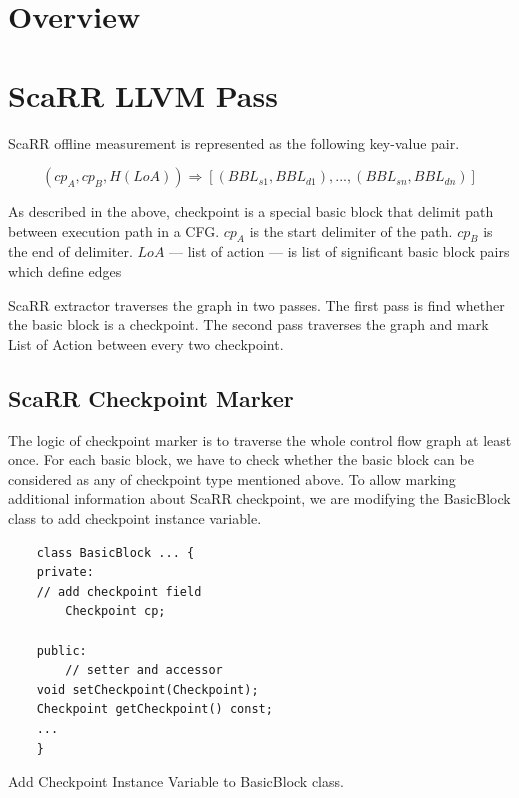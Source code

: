 \section{Overview}



\section{ScaRR LLVM Pass}

ScaRR offline measurement is represented as the following key-value pair.

$$(cp_A, cp_B, H(LoA)) \Rightarrow [(BBL_{s1}, BBL_{d1}), ..., (BBL_{sn}, BBL_{dn})]$$

As described in the above, checkpoint is a special basic block that delimit path between execution path in a CFG. $cp_A$ is the start delimiter of the path. $cp_B$ is the end of delimiter. $LoA$ — list of action — is list of significant basic block pairs which define edges 

ScaRR extractor traverses the graph in two passes. The first pass is find whether the basic block is a checkpoint. The second pass traverses the graph and mark List of Action between every two checkpoint. 

\subsection{ScaRR Checkpoint Marker}

The logic of checkpoint marker is to traverse the whole control flow graph at least once. For each basic block, we have to check whether the basic block can be considered as any of checkpoint type mentioned above. To allow marking additional information about ScaRR checkpoint, we are modifying the BasicBlock class to add checkpoint instance variable.

\begin{listing}
\begin{verbatim}
    class BasicBlock ... {
    private:
    // add checkpoint field
        Checkpoint cp;

    public:
        // setter and accessor
    void setCheckpoint(Checkpoint);
    Checkpoint getCheckpoint() const;
    ...
    }
\end{verbatim}
\caption{Add Checkpoint Instance Variable to BasicBlock class.}    
\label{listing:4-1}
\end{listing}

